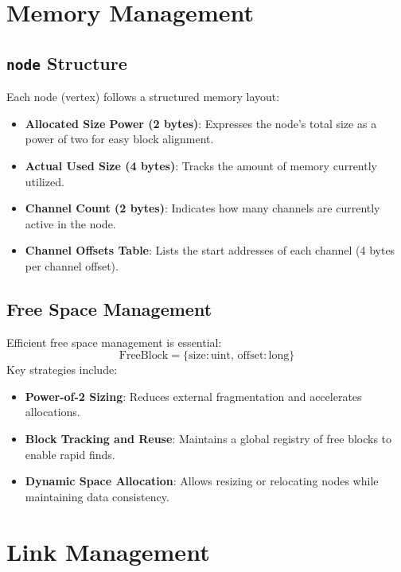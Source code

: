 \documentclass[12pt, a4paper]{article}
\begin{document}
\section{Memory Management}\label{Sec:Memory}
\subsection{\texttt{node} Structure}
Each node (vertex) follows a structured memory layout:
\begin{itemize}
    \item \textbf{Allocated Size Power (2 bytes)}: Expresses the node's total size as a power of two for easy block alignment.
    \item \textbf{Actual Used Size (4 bytes)}: Tracks the amount of memory currently utilized.
    \item \textbf{Channel Count (2 bytes)}: Indicates how many channels are currently active in the node.
    \item \textbf{Channel Offsets Table}: Lists the start addresses of each channel (4 bytes per channel offset).
\end{itemize}

\subsection{Free Space Management}
Efficient free space management is essential:
\begin{equation}
    \mathrm{FreeBlock} = \{ \mathrm{size}: \mathrm{uint},\, \mathrm{offset}: \mathrm{long} \}
\end{equation}
Key strategies include:
\begin{itemize}
    \item \textbf{Power-of-2 Sizing}: Reduces external fragmentation and accelerates allocations.
    \item \textbf{Block Tracking and Reuse}: Maintains a global registry of free blocks to enable rapid finds.
    \item \textbf{Dynamic Space Allocation}: Allows resizing or relocating nodes while maintaining data consistency.
\end{itemize}

\section{Link Management}\label{Sec:Links}
\end{document}
